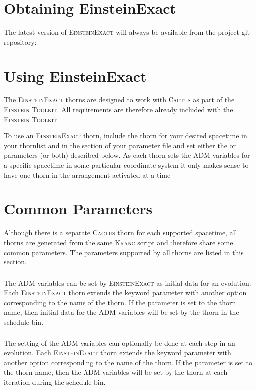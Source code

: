 \documentclass{article}
\begin{document}
\section{Obtaining EinsteinExact}
The latest version of \textsc{EinsteinExact} will always be available from the
project git repository:


\section{Using EinsteinExact}
The \textsc{EinsteinExact} thorns are designed to work with \textsc{Cactus} as
part of the \textsc{Einstein Toolkit}. All requirements are therefore already included
with the \textsc{Einstein Toolkit}.

To use an \textsc{EinsteinExact} thorn, include the thorn for your desired spacetime in your
thornlist and in the  section of your parameter file and set either
the  or 
parameters (or both) described below. As each thorn sets the ADM variables for a
specific spacetime in some particular coordinate system it only makes sense to
have one thorn in the arrangement activated at a time.

\section{Common Parameters}
Although there is a separate \textsc{Cactus} thorn for each supported spacetime, all
thorns are generated from the same \textsc{Kranc} script and therefore share some
common parameters. The parameters supported by all thorns are listed in this
section.

\subsubsection{}
The ADM variables can be set by \textsc{EinsteinExact}
as initial data for an evolution. Each
\textsc{EinsteinExact} thorn extends the 
keyword parameter with another option corresponding to the name of the thorn.
If the parameter is set to the thorn name, then initial data for the ADM
variables will be set by the thorn in the  schedule
bin.

\subsubsection{}
The setting of the ADM variables can optionally be done at each step in an
evolution. Each \textsc{EinsteinExact} thorn extends the
keyword parameter with another option corresponding to the name of the thorn.
If the parameter is set to the thorn name, then the ADM variables will be set
by the thorn at each iteration during the  schedule bin.
\end{document}
